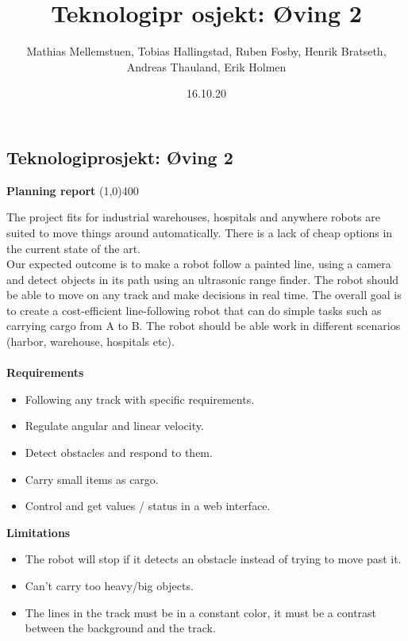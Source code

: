 \documentclass[11pt]{article}
\title{Teknologipr  osjekt: Øving 2}
\author{Mathias Mellemstuen, Tobias Hallingstad, Ruben Fosby, Henrik Bratseth, Andreas Thauland, Erik Holmen}
\date{16.10.20}
\begin{document}
\begin{center}
\section*{Teknologiprosjekt: Øving 2}
\textbf{Planning report}
\line(1,0){400}
\end{center}
The project fits for industrial warehouses, hospitals and anywhere robots are suited to move things around automatically. There is a lack of cheap options in the current state of the art.
\\Our expected outcome is to make a robot follow a painted line, using a camera and detect objects in its path using an ultrasonic range finder. The robot should be able to move on any track and make decisions in real time.
The overall goal is to create a cost-efficient line-following robot that can do simple tasks such as carrying cargo from A to B. The robot should be able work in different scenarios (harbor, warehouse, hospitals etc).
\\\\
\textbf{Requirements}\\
\begin{itemize}
    \item Following any track with specific requirements.
    \item Regulate angular and linear velocity.
    \item Detect obstacles and respond to them. 
    \item Carry small items as cargo.
    \item Control and get values / status in a web interface.
\end{itemize}
\textbf{Limitations}
\\
\begin{itemize}
	\item The robot will stop if it detects an obstacle instead of trying to move past it. 
	\item Can’t carry too heavy/big objects.
	\item The lines in the track must be in a constant color, it must be a contrast between the background and the track. 
\end{itemize}
\end{document}
